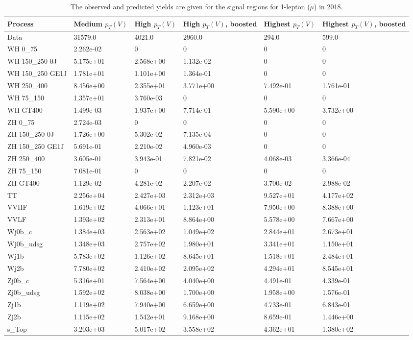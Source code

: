 \begin{table}
\centering
\caption[2018 1-lepton ($\mu$) signal selection yields]{
                  The observed and predicted yields are given for the
                  signal regions for 1-lepton ($\mu$) in 2018.
                  }
{\footnotesize
\begin{tabularx}{\textwidth}{|X|X|X|X|X|X|}
\hline
Process & Medium $p_{T}(V)$ & High $p_{T}(V)$ & High $p_{T}(V)$, boosted & Highest $p_{T}(V)$ & Highest $p_{T}(V)$, boosted \\
\hline
Data & 31579.0 & 4021.0 & 2960.0 & 294.0 & 599.0 \\
\hline
WH 0\_75 & 2.262e-02 & 0 & 0 & 0 & 0 \\
WH 150\_250 0J & 5.175e+01 & 2.568e+00 & 1.132e-02 & 0 & 0 \\
WH 150\_250 GE1J & 1.781e+01 & 1.101e+00 & 1.364e-01 & 0 & 0 \\
WH 250\_400 & 8.456e+00 & 2.355e+01 & 3.771e+00 & 7.492e-01 & 1.761e-01 \\
WH 75\_150 & 1.357e+01 & 3.760e-03 & 0 & 0 & 0 \\
WH GT400 & 1.499e-03 & 1.937e+00 & 7.714e-01 & 5.590e+00 & 3.732e+00 \\
ZH 0\_75 & 2.724e-03 & 0 & 0 & 0 & 0 \\
ZH 150\_250 0J & 1.726e+00 & 5.302e-02 & 7.135e-04 & 0 & 0 \\
ZH 150\_250 GE1J & 5.691e-01 & 2.210e-02 & 4.960e-03 & 0 & 0 \\
ZH 250\_400 & 3.605e-01 & 3.943e-01 & 7.821e-02 & 4.068e-03 & 3.366e-04 \\
ZH 75\_150 & 7.081e-01 & 0 & 0 & 0 & 0 \\
ZH GT400 & 1.129e-02 & 4.281e-02 & 2.207e-02 & 3.700e-02 & 2.988e-02 \\
\hline
TT & 2.256e+04 & 2.427e+03 & 2.312e+03 & 9.527e+01 & 4.177e+02 \\
VVHF & 1.619e+02 & 4.066e+01 & 1.123e+01 & 7.950e+00 & 8.388e+00 \\
VVLF & 1.393e+02 & 2.313e+01 & 8.864e+00 & 5.578e+00 & 7.667e+00 \\
Wj0b\_c & 1.384e+03 & 2.563e+02 & 1.049e+02 & 2.844e+01 & 2.673e+01 \\
Wj0b\_udsg & 1.348e+03 & 2.757e+02 & 1.980e+01 & 3.341e+01 & 1.150e+01 \\
Wj1b & 5.783e+02 & 1.126e+02 & 8.645e+01 & 1.518e+01 & 2.484e+01 \\
Wj2b & 7.780e+02 & 2.410e+02 & 2.095e+02 & 4.294e+01 & 8.545e+01 \\
Zj0b\_c & 5.316e+01 & 7.564e+00 & 4.040e+00 & 4.491e-01 & 4.339e-01 \\
Zj0b\_udsg & 1.592e+02 & 8.038e+00 & 1.700e+00 & 1.958e+00 & 1.576e-01 \\
Zj1b & 1.119e+02 & 7.940e+00 & 6.659e+00 & 4.733e-01 & 6.843e-01 \\
Zj2b & 1.115e+02 & 1.542e+01 & 9.168e+00 & 8.659e-01 & 1.446e+00 \\
s\_Top & 3.203e+03 & 5.017e+02 & 3.558e+02 & 4.362e+01 & 1.380e+02 \\
\hline
\end{tabularx}
}
\label{tab:sr-Wmn-2018}
\end{table}

